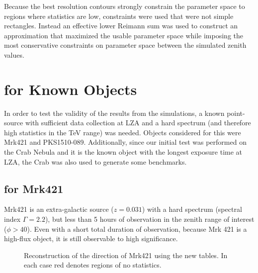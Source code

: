 \documentclass[main.tex]{subfiles}
\begin{document}
Because the best resolution contours strongly constrain the parameter space to regions where statistics are low, constraints were used that were not simple rectangles. Instead an effective lower Reimann sum was used to construct an approximation that maximized the usable parameter space while imposing the most conservative constraints on parameter space between the simulated zenith values.
\section{\rse for Known Objects}
In order to test the validity of the results from the simulations, a known point-source with sufficient data collection at LZA and a hard spectrum (and therefore high statistics in the TeV range) was needed. Objects considered for this were Mrk421 and PKS1510-089. Additionally, since our initial test was performed on the Crab Nebula and it is the known object with the longest exposure time at LZA, the Crab was also used to generate some benchmarks.

\subsection{\rse for Mrk421}
Mrk421 is an extra-galactic source ($z=0.031$) with a hard spectrum (spectral index $\Gamma=2.2$), but less than 5 hours of observation in the zenith range of interest ($\phi>40$). Even with a short total duration of observation, because Mrk 421 is a high-flux object, it is still observable to high significance.

\begin{figure}[H]
  \begin{center}
  \end{center}
  \caption[Mrk421 direction reconstruction using Method5t.]{Reconstruction of the direction of Mrk421 using the new \disp tables. In each case red denotes regions of no statistics.}
  \label{fig:mrk_disp}
\end{figure}
\end{document}

